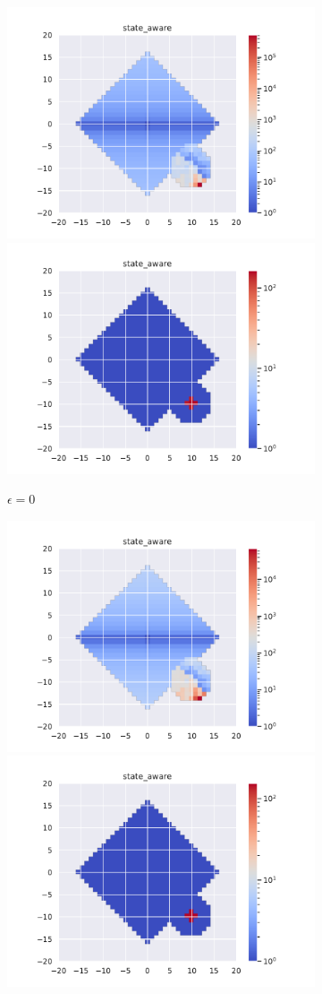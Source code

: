 \documentclass[runningheads]{llncs}
\begin{document}
\begin{figure}[H]
    \centering
    \begin{subfigure}[b]{\linewidth}
        \centering
        \includegraphics[width=0.49\linewidth]{img/epsilon/0/updates_state_aware.pdf}
        \includegraphics[width=0.49\linewidth]{img/epsilon/0/occupations_state_aware.pdf}
        \caption{$\epsilon=0$}
    \end{subfigure}
    \begin{subfigure}[b]{\linewidth}
        \centering
        \includegraphics[width=0.49\linewidth]{img/epsilon/1e-2/updates_state_aware.pdf}
        \includegraphics[width=0.49\linewidth]{img/epsilon/1e-2/occupations_state_aware.pdf}

\end{subfigure}
\end{figure}
\end{document}
